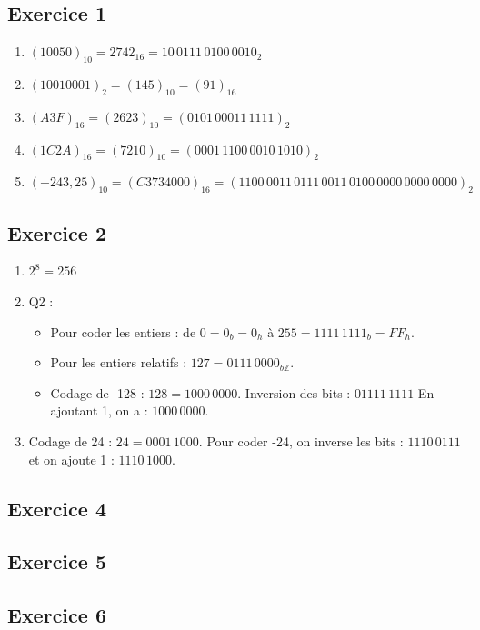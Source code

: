\documentclass[10pt,fleqn]{article} %
\begin{document}
\begin{multicols}{2}
\vspace{2cm}
\subsection*{Exercice 1}
\begin{enumerate}
\item $(10050)_{10}=2742_{16}=10\,0111\,0100\,0010_2$
\item $(1001 0001)_{2}=(145)_{10}=(91)_{16}$
\item $(A3F)_{16}=(2623)_{10}=(0101\, 00011\, 1111)_{2}$
\item $(1C2A)_{16}=(7210)_{10}=(0001\,1100\,0010\,1010)_{2}$
\item $(-243,25)_{10}=(C3734000)_{16} = (1100\,0011\, 0111\,0011\, 0100\,0000\, 0000\,0000)_{2}$
\end{enumerate}

\subsection*{Exercice 2}
\begin{enumerate}
\item $2^8  = 256$
\item Q2 :
\begin{itemize}
\item Pour coder les entiers : de $0 = 0_b=0_h$ à $255=1111\,1111_b=FF_h$.
\item Pour les entiers relatifs : $127=0111\,0000_{b\mathbb{Z}}$.
\item Codage de -128 : $128=1000\,0000$. Inversion des bits : $01111\,1111$ En ajoutant 1, on a : $1000\,0000$.  
\end{itemize}
\item Codage de 24 : $24=0001\,1000$. Pour coder -24, on inverse les bits : $1110\,0111$ et on ajoute 1 : $1110\,1000$.
\end{enumerate}
\subsection*{Exercice 4}
\subsection*{Exercice 5}
\subsection*{Exercice 6}


\end{multicols}
\end{document}
